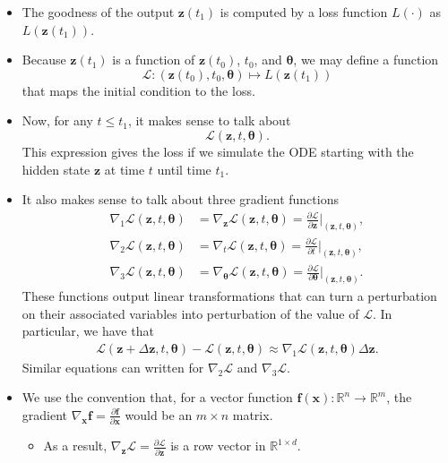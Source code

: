 \documentclass[10pt]{article}
\newcommand{\ve}[1]{\mathbf{#1}}
\newcommand{\ves}[1]{\boldsymbol{#1}}
\newcommand{\mcal}[1]{\mathcal{#1}}
\newcommand{\Real}{\mathbb{R}}
\begin{document}
\begin{itemize}
  \item The goodness of the output $\ve{z}(t_1)$ is computed by a loss function $L(\cdot)$ as $L(\ve{z}(t_1))$.
  
  \item Because $\ve{z}(t_1)$ is a function of $\ve{z}(t_0)$, $t_0$, and $\ves{\theta}$, we may define a function $$\mcal{L}: (\ve{z}(t_0), t_0, \ves{\theta}) \mapsto L(\ve{z}(t_1))$$
  that maps the initial condition to the loss.

  \item Now, for any $t \leq t_1$, it makes sense to talk about $$\mcal{L}(\ve{z}, t, \ves{\theta}).$$ This expression gives the loss if we simulate the ODE starting with the hidden state $\ve{z}$ at time $t$ until time $t_1$.
  
  \item It also makes sense to talk about three gradient functions
  \begin{align*}
    \nabla_1\mcal{L}(\ve{z},t,\ves{\theta})
    & = \nabla_{\ve{z}}\mcal{L}(\ve{z},t,\ves{\theta})
    = 
    \frac{\partial \mcal{L}}{\partial \ve{z}} \bigg|_{(\ve{z}, t, \ves{\theta})}, \\
    \nabla_2\mcal{L}(\ve{z},t,\ves{\theta})
    & = \nabla_t \mcal{L}(\ve{z}, t, \ves{\theta})
    = \frac{\partial \mcal{L}}{\partial t} \bigg|_{(\ve{z}, t, \ves{\theta})}, \\
    \nabla_3\mcal{L}(\ve{z},t,\ves{\theta})
    &= \nabla_{\ves{\theta}} \mcal{L}(\ve{z}, t, \ves{\theta})
    = \frac{\partial \mcal{L}}{\partial \ves{\theta}} \bigg|_{(\ve{z}, t, \ves{\theta})}.
  \end{align*}
  These functions output linear transformations that can turn a perturbation on their associated variables into perturbation of the value of $\mcal{L}$. In particular, we have that
  \begin{align*}
    \mcal{L}(\ve{z} + \Delta\ve{z}, t, \ves{\theta})
    - \mcal{L}(\ve{z}, t, \ves{\theta})
    \approx \nabla_1 \mcal{L}(\ve{z}, t, \ves{\theta}) \Delta\ve{z}.
  \end{align*}
  Similar equations can written for $\nabla_2 \mcal{L}$ and $\nabla_3 \mcal{L}$. 

  \item We use the convention that, for a vector function $\ve{f}(\ve{x}): \Real^n \rightarrow \Real^m$, the gradient  $\nabla_{\ve{x}} \ve{f} = \frac{\partial \ve{f}}{\partial \ve{x}}$ would be an $m \times n$ matrix.
  \begin{itemize}
    \item As a result, $\nabla_\ve{z}\mcal{L} = \frac{\partial \mcal{L}}{\partial \ve{z}}$ is a row vector in $\Real^{1 \times d}$.
  \end{itemize}


\end{itemize}
\end{document}
